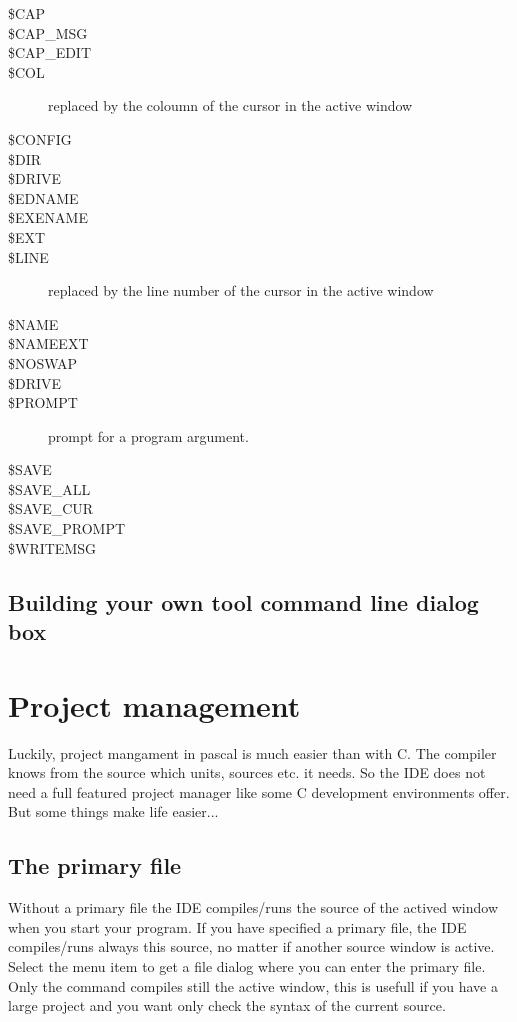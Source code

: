 \begin{description}
\item[\$CAP]
\item[\$CAP\_MSG]
\item[\$CAP\_EDIT]
\item[\$COL] replaced by the coloumn of the cursor in the active window
\item[\$CONFIG]
\item[\$DIR]
\item[\$DRIVE]
\item[\$EDNAME]
\item[\$EXENAME]
\item[\$EXT]
\item[\$LINE] replaced by the line number of the cursor in the active window
\item[\$NAME]
\item[\$NAMEEXT]
\item[\$NOSWAP]
\item[\$DRIVE]
\item[\$PROMPT] prompt for a program argument.
\item[\$SAVE] 
\item[\$SAVE\_ALL]
\item[\$SAVE\_CUR]
\item[\$SAVE\_PROMPT]
\item[\$WRITEMSG]
\end{description}	

\subsection{Building your own tool command line dialog box}

\section{Project management}
\label{se:projectmanagement}
Luckily, project mangament in pascal is much easier than with C. The
compiler knows from the source which units, sources etc. it needs.
So the \fpc IDE does not need a full featured project manager like
some C development environments offer. But some things make life easier...

\subsection{The primary file}
\label{se:primaryfile}
Without a primary file the IDE compiles/runs the source of the actived
window when you start your program. If you have specified a primary
file, the IDE compiles/runs always this source, no matter if another
source window is active. Select the menu item 
to get a file dialog where you can enter the primary file. Only the command
 compiles still the active window, this is usefull
if you have a large project and you want only check the syntax of the
current source.

